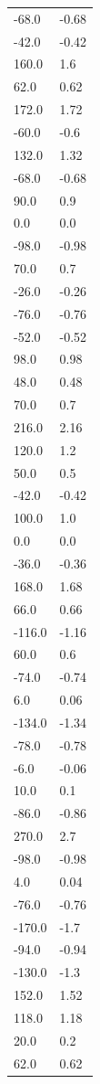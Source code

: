 \begin{longtable}{ll}
-68.0 & -0.68 \\
-42.0 & -0.42 \\
160.0 & 1.6 \\
62.0 & 0.62 \\
172.0 & 1.72 \\
-60.0 & -0.6 \\
132.0 & 1.32 \\
-68.0 & -0.68 \\
90.0 & 0.9 \\
0.0 & 0.0 \\
-98.0 & -0.98 \\
70.0 & 0.7 \\
-26.0 & -0.26 \\
-76.0 & -0.76 \\
-52.0 & -0.52 \\
98.0 & 0.98 \\
48.0 & 0.48 \\
70.0 & 0.7 \\
216.0 & 2.16 \\
120.0 & 1.2 \\
50.0 & 0.5 \\
-42.0 & -0.42 \\
100.0 & 1.0 \\
0.0 & 0.0 \\
-36.0 & -0.36 \\
168.0 & 1.68 \\
66.0 & 0.66 \\
-116.0 & -1.16 \\
60.0 & 0.6 \\
-74.0 & -0.74 \\
6.0 & 0.06 \\
-134.0 & -1.34 \\
-78.0 & -0.78 \\
-6.0 & -0.06 \\
10.0 & 0.1 \\
-86.0 & -0.86 \\
270.0 & 2.7 \\
-98.0 & -0.98 \\
4.0 & 0.04 \\
-76.0 & -0.76 \\
-170.0 & -1.7 \\
-94.0 & -0.94 \\
-130.0 & -1.3 \\
152.0 & 1.52 \\
118.0 & 1.18 \\
20.0 & 0.2 \\
62.0 & 0.62 \\

\end{longtable}

